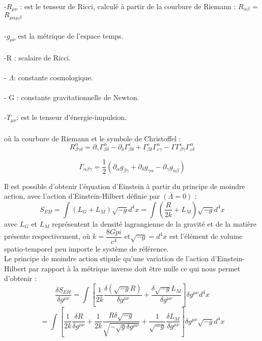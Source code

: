 	-$ R_{\mu\nu}$ : est le tenseur de Ricci, calculé à partir de la courbure de Riemann : $R_{\alpha\beta}$ =$ R_{\mu\alpha\mu\beta}$\\
	\\
	-$g_{\mu\nu}$ est la métrique de l’espace temps.\\
	\\
	-R : scalaire de Ricci.\\
	\\
	- $\Lambda$: constante cosmologique.\\
	\\
	- G : constante gravitationnelle de Newton.\\
	\\
	-$T_{\mu\nu}$: est le tenseur d’énergie-impulsion.\\
	\\
	où la courbure de Riemann et le symbole de Christoffel :
	\begin{equation}
	R_{\beta\gamma\delta}^{\alpha}= \partial_{\gamma}\Gamma_{\beta\delta}^{\alpha}-\partial_{\delta}\Gamma_{\beta\delta}^{\varepsilon}+ \Gamma_{\beta\delta}^{\varepsilon}         \Gamma_{\varepsilon\gamma}^\alpha- \Gamma\Gamma_{\beta\gamma}^{\varepsilon}\Gamma_{\varepsilon\delta}^{\alpha}
	\end{equation}
	
	
	\begin{equation}
	\Gamma_{\alpha\beta\gamma} = \dfrac{1}{2}( \partial_{\alpha}g_{\beta\gamma}+\partial_{\delta}g_{\gamma\alpha}-\partial_{\gamma}g_{\alpha\beta})
	\end{equation}
	
	Il est possible d’obtenir l’équation d’Einstein à partir du principe de moindre action, avec
	l’action d’Einstein-Hilbert définie par $(\Lambda = 0)$ :
	\begin{equation}
	S_{EH} = \int (L_{G} + L_{M})\sqrt{-g} d^{4}x =  \int\left(\dfrac{R}{2k} + L_{M} \right)\sqrt{-g} d^{4}x
	\end{equation}
	avec $L_{G}$ et $L_{M}$ représentent la densité lagrangienne de la gravité et de la matière présente
	respectivement, où $k = \dfrac{8Gpi}{c^{4}}$  et$ \sqrt{-g} = d^{4}x$ est l’élément de volume spatio-temporel peu importe le système de référence.\\
	Le principe de moindre action stipule qu’une variation de l’action d’Einstein-Hilbert par rapport
	à la métrique inverse doit être nulle ce qui nous permet d’obtenir :
	\begin{equation}
	\dfrac{\delta S_{EH}}{\delta g^{\mu\nu}} = \int\left[\dfrac{1}{2k}\dfrac{\delta (\sqrt{-g}R)}{
		\delta g^{\mu\nu}}+\dfrac{\delta \sqrt{-g}L_{M}}{\delta g^{\mu\nu}} \right]\delta g^{\mu\nu}d^{4}x
	\end{equation}
	\begin{equation}
	= \int\left[\dfrac{1}{2k}\dfrac{\delta R}{\delta g^{\mu\nu}}+\dfrac{1}{2k}\dfrac{R\delta \sqrt{-g}}{\sqrt{-\sqrt{g}\delta g^{\mu\nu}}}+\dfrac{1}{\sqrt{-g}}\dfrac{\delta L_{M}}{\delta g^{\mu\nu}}\right]\delta g^{\mu\nu}\sqrt{-g}d^{4}x 
	\end{equation}
	
